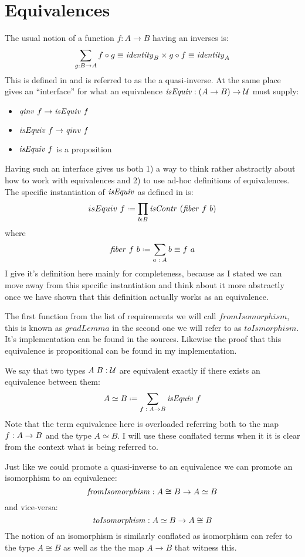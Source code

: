 \section{Equivalences}
\label{sec:equiv}
The usual notion of a function $f : A \to B$ having an inverses is:
%
$$
\sum_{g : B \to A} f \circ g \equiv \mathit{identity}_{B} \times g \circ f \equiv \mathit{identity}_{A}
$$
%
This is defined in \cite[p. 129]{hott-2013} and is referred to as the a
quasi-inverse. At the same place \cite{hott-2013} gives an ``interface'' for
what an equivalence $\mathit{isEquiv} : (A \to B) \to \mathcal{U}$ must supply:
%
\begin{itemize}
\item
  $\qinv\ f \to \isEquiv\ f$
\item
  $\isEquiv\ f \to \qinv\ f$
\item
  $\mathit{isEquiv}\ f$ is a proposition
\end{itemize}
%
Having such an interface gives us both 1) a way to think rather abstractly about
how to work with equivalences and 2) to use ad-hoc definitions of equivalences.
The specific instantiation of $\mathit{isEquiv}$ as defined in \cite{cubical-agda} is:
%
$$
isEquiv\ f \defeq \prod_{b : B} \isContr\ (\fiber\ f\ b)
$$
where
$$
\fiber\ f\ b \defeq \sum_{a \tp A} b \equiv f\ a
$$
%
I give it's definition here mainly for completeness, because as I stated we can
move away from this specific instantiation and think about it more abstractly
once we have shown that this definition actually works as an equivalence.

The first function from the list of requirements we will call
$\mathit{fromIsomorphism}$, this is known as $\mathit{gradLemma}$ in
\cite{cubical-agda} the second one we will refer to as $\mathit{toIsmorphism}$. It's
implementation can be found in the sources. Likewise the proof that this
equivalence is propositional can be found in my implementation.

We say that two types $A\;B \;\mathord{:}\; \mathcal{U}$ are equivalent exactly if there exists an
equivalence between them:
%
$$
A \simeq B \defeq \sum_{f \tp A \to B} \isEquiv\ f
$$
%
Note that the term equivalence here is overloaded referring both to the map $f
\;\mathord{:}\; A \to B$ and the type $A \simeq B$. I will use these conflated terms when it
it is clear from the context what is being referred to.

Just like we could promote a quasi-inverse to an equivalence we can promote an
isomorphism to an equivalence:
%
$$
\mathit{fromIsomorphism} \;\mathord{:}\; A \cong B \to A \simeq B
$$
%
and vice-versa:
%
$$
\mathit{toIsomorphism} \;\mathord{:}\; A \simeq B \to A \cong B
$$
%
The notion of an isomorphism is similarly conflated as isomorphism can refer to
the type $A \cong B$ as well as the the map $A \to B$ that witness this.

